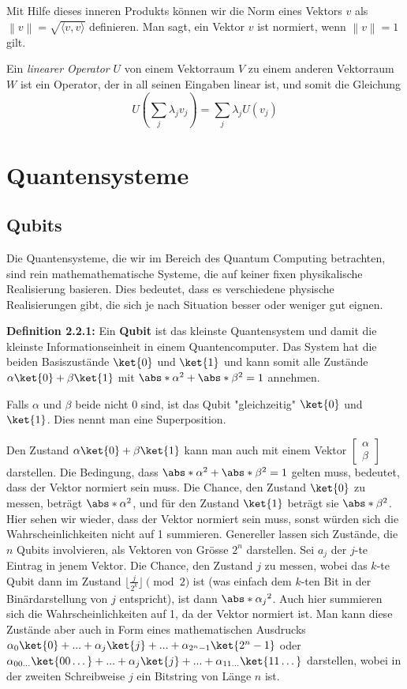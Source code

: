 Mit Hilfe dieses inneren Produkts können wir die Norm eines Vektors $v$ als $\left\| v \right\| = \sqrt{\langle v, v \rangle}$ definieren. Man sagt, ein Vektor $v$ ist normiert, wenn $\left\| v \right\| = 1$ gilt.

Ein \textit{linearer Operator} $U$ von einem Vektorraum $V$ zu einem anderen Vektorraum $W$ ist ein Operator, der in all seinen Eingaben linear ist, und somit die Gleichung $$U(\sum_j{\lambda_j v_j}) = \sum_j\lambda_j U(v_j)$$
\section{Quantensysteme}
\subsection{Qubits}
Die Quantensysteme, die wir im Bereich des Quantum Computing betrachten, sind rein mathemathematische Systeme, die auf keiner fixen physikalische Realisierung basieren. Dies bedeutet, dass es verschiedene physische Realisierungen gibt, die sich je nach Situation besser oder weniger gut eignen.

\textbf{Definition 2.2.1:} Ein \textbf{Qubit} ist das kleinste Quantensystem und damit die kleinste Informationseinheit in einem Quantencomputer. Das System hat die beiden Basiszustände $\ket{0}$ und $\ket{1}$ und kann somit alle Zustände $\alpha\ket{0} + \beta\ket{1}$ mit $\abs*{\alpha}^2 + \abs*{\beta}^2 = 1$ annehmen.

Falls $\alpha$ und $\beta$ beide nicht 0 sind, ist das Qubit "gleichzeitig" $\ket{0}$ und $\ket{1}$. Dies nennt man eine Superposition. 

Den Zustand $\alpha\ket{0} + \beta\ket{1}$ kann man auch mit einem Vektor $\begin{bmatrix}\alpha \\ \beta\end{bmatrix}$ darstellen. Die Bedingung, dass $\abs*{\alpha}^2 + \abs*{\beta}^2 = 1$ gelten muss, bedeutet, dass der Vektor normiert sein muss. Die Chance, den Zustand $\ket{0}$ zu messen, beträgt $\abs*{\alpha}^2$, und für den Zustand $\ket{1}$ beträgt sie $\abs*{\beta}^2$. Hier sehen wir wieder, dass der Vektor normiert sein muss, sonst würden sich die Wahrscheinlichkeiten nicht auf 1 summieren.
Genereller lassen sich Zustände, die $n$ Qubits involvieren, als Vektoren von Grösse $2^n$ darstellen. Sei $a_j$ der $j$-te Eintrag in jenem Vektor. Die Chance, den Zustand $j$ zu messen, wobei das $k$-te Qubit dann im Zustand $\lfloor \frac{j}{2^k} \rfloor \pmod{2}$ ist (was einfach dem $k$-ten Bit in der Binärdarstellung von $j$ entspricht), ist dann $\abs*{\alpha_j}^2$. Auch hier summieren sich die Wahrscheinlichkeiten auf 1, da der Vektor normiert ist. Man kann diese Zustände aber auch in Form eines mathematischen Ausdrucks $\alpha_0\ket{0} + ... + \alpha_j\ket{j} + ... + \alpha_{2^n - 1}\ket{2^n - 1}$ oder $\alpha_{00\dots}\ket{00\dots} + ... + \alpha_{j}\ket{j} + ... + \alpha_{11\dots}\ket{11\dots}$ darstellen, wobei in der zweiten Schreibweise $j$ ein Bitstring von Länge $n$ ist.


